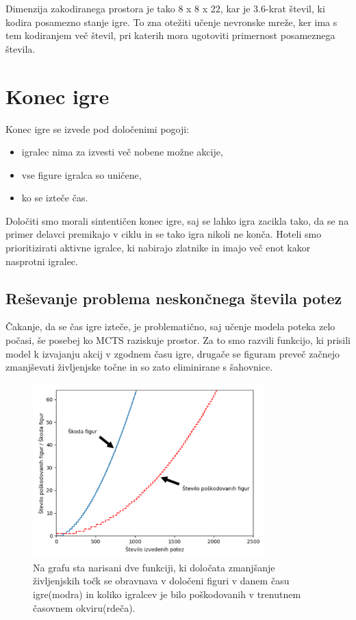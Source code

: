 \documentclass[a4paper, 12pt]{book}
\begin{document}
Dimenzija zakodiranega prostora je tako 8 x 8 x 22, kar je 3.6-krat števil, ki kodira posamezno stanje igre.
To zna otežiti učenje nevronske mreže, ker ima s tem kodiranjem več števil, pri katerih mora ugotoviti primernost posameznega števila.


\section{Konec igre}
\label{sKonecIgre}
Konec igre se izvede pod določenimi pogoji:
\begin{itemize}
	\item igralec nima za izvesti več nobene možne akcije,
	\item vse figure igralca so uničene,
	\item ko se izteče čas.
\end{itemize}

Določiti smo morali sintentičen konec igre, saj se lahko igra zacikla tako, da se na primer delavci premikajo v ciklu in se tako igra nikoli ne konča.
Hoteli smo prioritizirati aktivne igralce, ki nabirajo zlatnike in imajo več enot kakor nasprotni igralec.

\subsection{Reševanje problema neskončnega števila potez}
\label{sKillFunction}
Čakanje, da se čas igre izteče, je problematično, saj učenje modela poteka zelo počasi, še posebej ko MCTS raziskuje prostor.
Za to smo razvili funkcijo, ki prisili model k izvajanju akcij v zgodnem času igre, drugače se figuram preveč začnejo zmanjševati življenjske točne in so zato eliminirane s šahovnice.


\begin{figure}[h]
	\begin{center}
		\includegraphics[width=0.8\textwidth]{photos/destroy_formula_2018_11_17.pdf}
	\end{center}
	\caption{Na grafu sta narisani dve funkciji, ki določata zmanjšanje življenjskih točk se obravnava v določeni figuri v danem času igre(modra) in koliko igralcev je bilo poškodovanih v trenutnem časovnem okviru(rdeča).}
	\label{destroy_formula_2018_11_17}
\end{figure}
\end{document}
